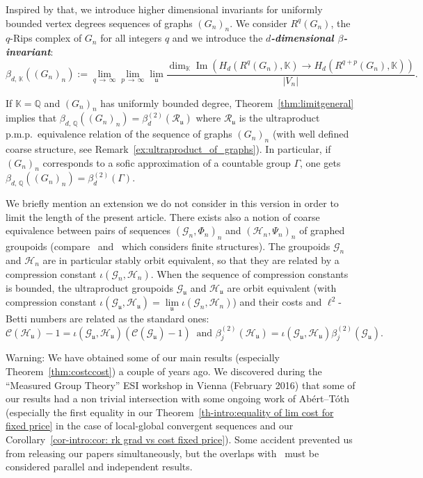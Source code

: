 \documentclass[10pt]{amsart}
\theoremstyle{definition}
\newcommand{\defin}[1]{\textbf{\emph{#1}}}
\newcommand{\Qmath}{\mathbb{Q}}
\newcommand{\Kmath}{\mathbb{K}}
\newcommand{\RR}{\mathcal{R}}
\newcommand{\cost}{\mathcal{C}}
\newcommand{\ch}{\mathcal{H}}
\newcommand{\cg}{\mathcal{G}}
\DeclareMathOperator{\Ima}{Im}
\newcommand{\ul}{\mathfrak{u}}
\newcommand{\pmp}{p.m.p.\ }
\begin{document}
Inspired by that, we introduce higher dimensional invariants for uniformly bounded vertex degrees sequences of graphs $(G_n)_n$. We consider $R^q(G_n)$, the $q$-Rips complex of $G_n$ for all integers $q$ and we introduce the
\defin{$d$-dimensional $\beta$-invariant}:
\[
\beta_{d,\,\Kmath}((G_n)_n):=\lim_{q\,\to\,\infty}\lim_{p\,\to\,\infty} \lim_\ul \frac{\dim_\Kmath \Ima \left(H_d\left(R^{q}(G_n), \Kmath\right)\to H_d\left(R^{q+p}(G_n),\Kmath\right) \right)}{\vert V_n\vert}.
\]

If $\Kmath=\Qmath$ and $(G_n)_n$ has uniformly bounded degree, Theorem~\ref{thm:limitgeneral} implies that $\beta_{d,\,\mathbb{\Qmath}}((G_n)_n)=\beta_d^{(2)}(\RR_\ul)$ where $\RR_\ul$ is the ultraproduct \pmp equivalence relation of the sequence of graphs $(G_n)_n$ (with well defined coarse structure, see Remark~\ref{ex:ultraproduct_of_graphs}). In particular, if $(G_n)_n$ corresponds to a sofic approximation of a countable group $\Gamma$, one gets $\beta_{d,\,\mathbb{\Qmath}}((G_n)_n)=\beta_d^{(2)}(\Gamma)$.



We briefly mention an extension we do not consider in this version in order to limit the length of the present article. There exists also a notion of coarse equivalence between pairs of sequences $(\cg_n,\Phi_n)_n$ and $(\ch_n, \Psi_n)_n$ of graphed groupoids (compare~\cite{Alekseev-Finn-Sell-sofic-boundaries-2016} and~\cite{Kaiser-2017} which considers finite structures). The groupoids $\cg_n$ and $\ch_n$ are in particular stably orbit equivalent, so that they are related by a compression constant $\iota(\cg_n,\ch_n)$. When the sequence of compression constants is bounded, the ultraproduct groupoids $\cg_\ul$ and $\ch_\ul$ are orbit equivalent (with compression constant $\iota(\cg_\ul,\ch_\ul)=\lim\limits_{\ul} \iota(\cg_n,\ch_n)$) and their costs and $\ell^2$-Betti numbers are related as the standard ones:
\[
\cost(\ch_\ul)-1=\iota(\cg_\ul,\ch_\ul)(\cost(\cg_\ul)-1)\ \text{ and } \beta_j^{(2)}(\ch_\ul)=\iota(\cg_\ul,\ch_\ul) \beta_j^{(2)}(\cg_\ul).
\]





Warning: We have obtained some of our main results (especially Theorem~\ref{thm:costccost}) a couple of years ago. We discovered during the ``Measured Group Theory'' ESI workshop in Vienna (February 2016) that some of our results had a non trivial intersection with some ongoing work of Abért--Tóth (especially the first equality in our Theorem~\ref{th-intro:equality of lim cost for fixed price} in the case of local-global convergent sequences and our Corollary~\ref{cor-intro:cor: rk grad vs cost fixed price}). Some accident prevented us from releasing our papers simultaneously, but the overlaps with~\cite{Abert-Toth-unif-rk-grad-cost-loc-glob-cv} must be considered parallel and independent results.
\end{document}
